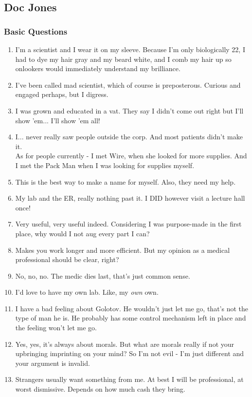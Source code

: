 \def\pfcname{Doc Jones}
\subsection{\pfcname}
\subsubsection{Basic Questions}
\begin{enumerate}
	\setlength\itemsep{-8mm}
	\item I'm a scientist and I wear it on my sleeve. Because I'm only biologically 22, I had to dye my hair gray and my beard white, and I comb my hair up so onlookers would immediately understand my brilliance.
	\item I've been called mad scientist, which of course is preposterous. Curious and engaged perhaps, but I digress.
	\item I was grown and educated in a vat. They say I didn't come out right but I'll show 'em... I'll show 'em all!
	\item I... never really saw people outside the corp. And most patients didn't make it.
		\\%
		As for people currently - I met Wire, when she looked for more supplies.
		And I met the Pack Man when I was looking for supplies myself.
	\item This is the best way to make a name for myself. Also, they need my help.
	\item My lab and the ER, really nothing past it. I DID however visit a lecture hall once!
	\item Very useful, very useful indeed. Considering I was purpose-made in the first place, why would I not aug every part I can?
	\item Makes you work longer and more efficient. But my opinion as a medical professional should be clear, right?
	\item No, no, no. The medic dies last, that's just common sense.
	\item I'd love to have my own lab. Like, my \textit{own} own.
	\item I have a bad feeling about Golotov. He wouldn't just let me go, that's not the type of man he is. He probably has some control mechanism left in place and the feeling won't let me go.
	\item Yes, yes, it's always about morals. But what are morals really if not your upbringing imprinting on your mind? So I'm not evil - I'm just different and your argument is invalid.
	\item Strangers usually want something from me. At best I will be professional, at worst dismissive. Depends on how much cash they bring.

\end{enumerate}
